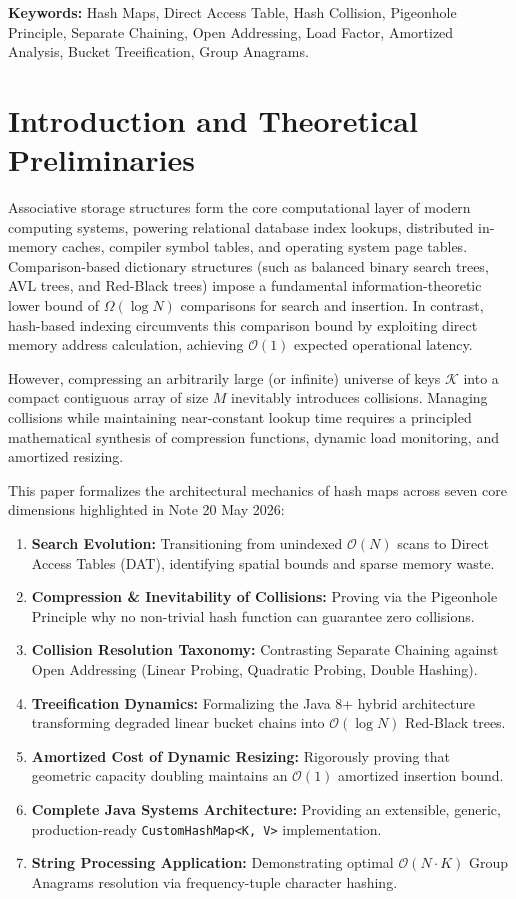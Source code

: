 \documentclass[10pt,twocolumn,letterpaper]{article}
\begin{document}
\vspace{1.0em}
\noindent\textbf{Keywords:} Hash Maps, Direct Access Table, Hash Collision, Pigeonhole Principle, Separate Chaining, Open Addressing, Load Factor, Amortized Analysis, Bucket Treeification, Group Anagrams.
\vspace{1.2em}

\section{Introduction and Theoretical Preliminaries}
\label{sec:intro}

Associative storage structures form the core computational layer of modern computing systems, powering relational database index lookups, distributed in-memory caches, compiler symbol tables, and operating system page tables. Comparison-based dictionary structures (such as balanced binary search trees, AVL trees, and Red-Black trees) impose a fundamental information-theoretic lower bound of $\Omega(\log N)$ comparisons for search and insertion. In contrast, hash-based indexing circumvents this comparison bound by exploiting direct memory address calculation, achieving $\mathcal{O}(1)$ expected operational latency.

However, compressing an arbitrarily large (or infinite) universe of keys $\mathcal{K}$ into a compact contiguous array of size $M$ inevitably introduces collisions. Managing collisions while maintaining near-constant lookup time requires a principled mathematical synthesis of compression functions, dynamic load monitoring, and amortized resizing.

This paper formalizes the architectural mechanics of hash maps across seven core dimensions highlighted in Note 20 May 2026:
\begin{enumerate}
    \item \textbf{Search Evolution:} Transitioning from unindexed $\mathcal{O}(N)$ scans to Direct Access Tables (DAT), identifying spatial bounds and sparse memory waste.
    \item \textbf{Compression \& Inevitability of Collisions:} Proving via the Pigeonhole Principle why no non-trivial hash function can guarantee zero collisions.
    \item \textbf{Collision Resolution Taxonomy:} Contrasting Separate Chaining against Open Addressing (Linear Probing, Quadratic Probing, Double Hashing).
    \item \textbf{Treeification Dynamics:} Formalizing the Java 8+ hybrid architecture transforming degraded linear bucket chains into $\mathcal{O}(\log N)$ Red-Black trees.
    \item \textbf{Amortized Cost of Dynamic Resizing:} Rigorously proving that geometric capacity doubling maintains an $\mathcal{O}(1)$ amortized insertion bound.
    \item \textbf{Complete Java Systems Architecture:} Providing an extensible, generic, production-ready \texttt{CustomHashMap<K, V>} implementation.
    \item \textbf{String Processing Application:} Demonstrating optimal $\mathcal{O}(N \cdot K)$ Group Anagrams resolution via frequency-tuple character hashing.
\end{enumerate}
\end{document}
